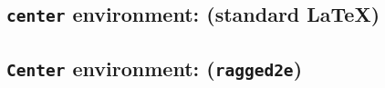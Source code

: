 \documentclass{article}
\begin{document}
	\setlength{\hsize}{0.9\hsize}%
	
	\subsection*{\texttt{center} environment: (standard \LaTeX{})}
	
	\begin{center}
		\blindtext[1]
	\end{center}
	
	\subsection*{\texttt{Center} environment: (\texttt{ragged2e})}
	\begin{Center}
		\blindtext[1]
	\end{Center}
\end{document}
